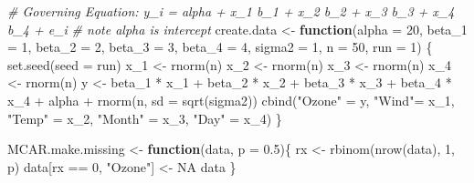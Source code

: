 \documentclass[
]{article}
\newenvironment{Shaded}{\begin{snugshade}}{\end{snugshade}}
\newcommand{\AttributeTok}[1]{\textcolor[rgb]{0.77,0.63,0.00}{#1}}
\newcommand{\CommentTok}[1]{\textcolor[rgb]{0.56,0.35,0.01}{\textit{#1}}}
\newcommand{\ConstantTok}[1]{\textcolor[rgb]{0.00,0.00,0.00}{#1}}
\newcommand{\ControlFlowTok}[1]{\textcolor[rgb]{0.13,0.29,0.53}{\textbf{#1}}}
\newcommand{\DecValTok}[1]{\textcolor[rgb]{0.00,0.00,0.81}{#1}}
\newcommand{\FloatTok}[1]{\textcolor[rgb]{0.00,0.00,0.81}{#1}}
\newcommand{\FunctionTok}[1]{\textcolor[rgb]{0.00,0.00,0.00}{#1}}
\newcommand{\NormalTok}[1]{#1}
\newcommand{\OtherTok}[1]{\textcolor[rgb]{0.56,0.35,0.01}{#1}}
\newcommand{\SpecialCharTok}[1]{\textcolor[rgb]{0.00,0.00,0.00}{#1}}
\newcommand{\StringTok}[1]{\textcolor[rgb]{0.31,0.60,0.02}{#1}}
\begin{document}
\begin{Shaded}
\begin{Highlighting}[]
\CommentTok{\# Governing Equation: y\_i = alpha + x\_1 b\_1 + x\_2 b\_2 + x\_3 b\_3 + x\_4 b\_4 + e\_i}
\CommentTok{\# note alpha is intercept}
\NormalTok{create.data }\OtherTok{\textless{}{-}} \ControlFlowTok{function}\NormalTok{(}\AttributeTok{alpha =} \DecValTok{20}\NormalTok{, }\AttributeTok{beta\_1 =} \DecValTok{1}\NormalTok{, }\AttributeTok{beta\_2 =} \DecValTok{2}\NormalTok{, }\AttributeTok{beta\_3 =} \DecValTok{3}\NormalTok{, }\AttributeTok{beta\_4 =} \DecValTok{4}\NormalTok{, }
                        \AttributeTok{sigma2 =} \DecValTok{1}\NormalTok{, }\AttributeTok{n =} \DecValTok{50}\NormalTok{, }\AttributeTok{run =} \DecValTok{1}\NormalTok{) \{}
  \FunctionTok{set.seed}\NormalTok{(}\AttributeTok{seed =}\NormalTok{ run)}
\NormalTok{  x\_1 }\OtherTok{\textless{}{-}} \FunctionTok{rnorm}\NormalTok{(n)}
\NormalTok{  x\_2 }\OtherTok{\textless{}{-}} \FunctionTok{rnorm}\NormalTok{(n)}
\NormalTok{  x\_3 }\OtherTok{\textless{}{-}} \FunctionTok{rnorm}\NormalTok{(n)}
\NormalTok{  x\_4 }\OtherTok{\textless{}{-}} \FunctionTok{rnorm}\NormalTok{(n)}
\NormalTok{  y }\OtherTok{\textless{}{-}}\NormalTok{ beta\_1 }\SpecialCharTok{*}\NormalTok{ x\_1 }\SpecialCharTok{+}\NormalTok{ beta\_2 }\SpecialCharTok{*}\NormalTok{ x\_2 }\SpecialCharTok{+}\NormalTok{ beta\_3 }\SpecialCharTok{*}\NormalTok{ x\_3 }\SpecialCharTok{+}\NormalTok{ beta\_4 }\SpecialCharTok{*}\NormalTok{ x\_4 }\SpecialCharTok{+}\NormalTok{ alpha }\SpecialCharTok{+} \FunctionTok{rnorm}\NormalTok{(n, }\AttributeTok{sd =} \FunctionTok{sqrt}\NormalTok{(sigma2))}
  \FunctionTok{cbind}\NormalTok{(}\StringTok{"Ozone"} \OtherTok{=}\NormalTok{ y, }\StringTok{"Wind"}\OtherTok{=}\NormalTok{ x\_1, }\StringTok{"Temp"} \OtherTok{=}\NormalTok{ x\_2, }\StringTok{"Month"} \OtherTok{=}\NormalTok{ x\_3, }\StringTok{"Day"} \OtherTok{=}\NormalTok{ x\_4)}
\NormalTok{\}}

\NormalTok{MCAR.make.missing }\OtherTok{\textless{}{-}} \ControlFlowTok{function}\NormalTok{(data, }\AttributeTok{p =} \FloatTok{0.5}\NormalTok{)\{}
\NormalTok{  rx }\OtherTok{\textless{}{-}} \FunctionTok{rbinom}\NormalTok{(}\FunctionTok{nrow}\NormalTok{(data), }\DecValTok{1}\NormalTok{, p)}
\NormalTok{  data[rx }\SpecialCharTok{==} \DecValTok{0}\NormalTok{, }\StringTok{"Ozone"}\NormalTok{] }\OtherTok{\textless{}{-}} \ConstantTok{NA}
\NormalTok{  data}
\NormalTok{\}}
\end{Highlighting}
\end{Shaded}
\end{document}
